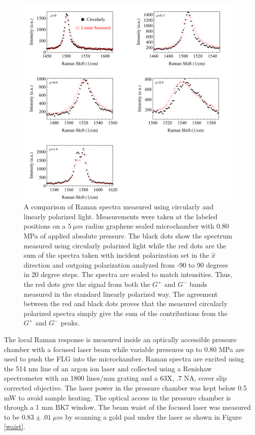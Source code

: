 \begin{figure}
\begin{center}
\includegraphics[scale=.75]{Figs_Friction/LinearvsCircular.pdf}
\end{center}
\caption{\label{circlelinear}A comparison of Raman spectra measured using circularly and linearly polarized light. Measurements were taken at the labeled positions on a $5 \ \mu m$ radius graphene sealed microchamber with 0.80 MPa of applied absolute pressure. The black dots show the spectrum measured using circularly polarized light while the red dots are the sum of the spectra taken with incident polarization set in the $\hat x$ direction and outgoing polarization analyzed from -90 to 90 degrees in 20 degree steps.  The spectra are scaled to match intensities. Thus, the red dots give the signal from both the $G^+$ and $G^-$ bands measured in the standard linearly polarized way.  The agreement between the red and black dots proves that the measured circularly polarized spectra simply give the sum of the contributions from the $G^+$ and $G^-$ peaks.}
\end{figure}

The local Raman response is measured inside an optically accessible pressure chamber with a focused laser beam while variable pressures up to 0.80 MPa are used to push the FLG into the microchamber.  Raman spectra are excited using the 514 nm line of an argon ion laser and collected using a Renishaw spectrometer with an 1800 lines/mm grating and a 63X, .7 NA, cover slip corrected objective.  The laser power in the pressure chamber was kept below 0.5 mW to avoid sample heating.  The optical access in the pressure chamber is through a 1 mm BK7 window.  The beam waist of the focused laser was measured to be $0.83 \pm .01 \ \mu m$ by scanning a gold pad under the laser as shown in Figure \ref{waist}.

